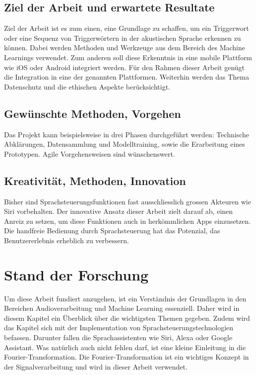 \documentclass[11pt,a4paper]{article}
\begin{document}
\subsection*{Ziel der Arbeit und erwartete Resultate}
Ziel der Arbeit ist es zum einen, eine Grundlage zu schaffen, um ein Triggerwort oder eine
Sequenz von Triggerwörtern in der akustischen Sprache erkennen zu können. Dabei werden
Methoden und Werkzeuge aus dem Bereich des Machine Learnings verwendet. Zum anderen soll
diese Erkenntnis in eine mobile Plattform wie iOS oder Android integriert werden. Für den
Rahmen dieser Arbeit genügt die Integration in eine der genannten Plattformen. Weiterhin
werden das Thema Datenschutz und die ethischen Aspekte berücksichtigt.

\subsection*{Gewünschte Methoden, Vorgehen}
Das Projekt kann beispielsweise in drei Phasen durchgeführt werden: Technische Abklärungen,
Datensammlung und Modelltraining, sowie die Erarbeitung eines Prototypen. Agile
Vorgehensweisen sind wünschenswert.

\subsection*{Kreativität, Methoden, Innovation}
Bisher sind Sprachsteuerungsfunktionen fast ausschliesslich grossen Akteuren wie Siri
vorbehalten. Der innovative Ansatz dieser Arbeit zielt darauf ab, einen Anreiz zu setzen,
um diese Funktionen auch in herkömmlichen Apps einzusetzen. Die handfreie Bedienung durch
Sprachsteuerung hat das Potenzial, das Benutzererlebnis erheblich zu verbessern.



\newpage
\section{Stand der Forschung}
Um diese Arbeit fundiert anzugehen, ist ein Verständnis der Grundlagen in den Bereichen 
Audioverarbeitung und Machine Learning essenziell. Daher wird in diesem Kapitel ein Überblick 
über die wichtigsten Themen gegeben. Zudem wird das Kapitel sich mit der Implementation von 
Sprachsteuerungstechnologien befassen. Darunter fallen die Sprachassistenten wie Siri, Alexa oder 
Google Assistant. Was natürlich auch nicht fehlen darf, ist eine kleine Einleitung in die 
Fourier-Transformation. Die Fourier-Transformation ist ein wichtiges Konzept in der 
Signalverarbeitung und wird in dieser Arbeit verwendet.
\end{document}
